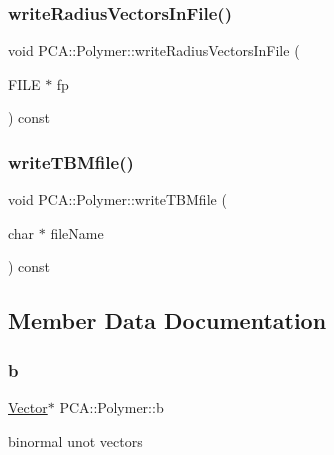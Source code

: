 \subsubsection{\texorpdfstring{write\+Radius\+Vectors\+In\+File()}{writeRadiusVectorsInFile()}}
{\footnotesize\ttfamily void P\+C\+A\+::\+Polymer\+::write\+Radius\+Vectors\+In\+File (\begin{DoxyParamCaption}\item[{F\+I\+LE $\ast$}]{fp }\end{DoxyParamCaption}) const}

\hypertarget{class_p_c_a_1_1_polymer_ac89188a3e56684ff3313a43ff83abea0}{}\label{class_p_c_a_1_1_polymer_ac89188a3e56684ff3313a43ff83abea0} 
\subsubsection{\texorpdfstring{write\+T\+B\+Mfile()}{writeTBMfile()}}
{\footnotesize\ttfamily void P\+C\+A\+::\+Polymer\+::write\+T\+B\+Mfile (\begin{DoxyParamCaption}\item[{char $\ast$}]{file\+Name }\end{DoxyParamCaption}) const}



\subsection{Member Data Documentation}
\hypertarget{class_p_c_a_1_1_polymer_ad93199b0187ab557476153b204b921c7}{}\label{class_p_c_a_1_1_polymer_ad93199b0187ab557476153b204b921c7} 
\subsubsection{\texorpdfstring{b}{b}}
{\footnotesize\ttfamily \hyperlink{class_p_c_a_1_1_vector}{Vector}$\ast$ P\+C\+A\+::\+Polymer\+::b\hspace{0.3cm}{\ttfamily [protected]}}



binormal unot vectors 

\hypertarget{class_p_c_a_1_1_polymer_a1bef29f1613bb4b67981aae7df3d804b}{}\label{class_p_c_a_1_1_polymer_a1bef29f1613bb4b67981aae7df3d804b} 
